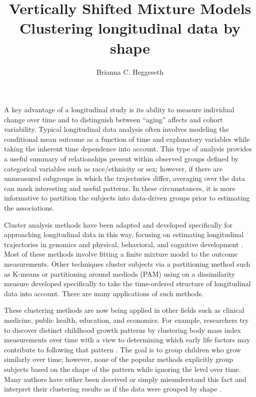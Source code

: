 \documentclass[12pt]{article}
\title{Vertically Shifted Mixture Models \\ Clustering longitudinal data by shape}
\author{Brianna C. Heggeseth}
\begin{document}
\maketitle

A key advantage of a longitudinal study is its ability to measure individual change over time and to distinguish between ``aging'' affects and cohort variability. Typical longitudinal data analysis often involves modeling the conditional mean outcome as a function of time and explanatory variables while taking the inherent time dependence into account. This type of analysis provides a useful summary of relationships present within observed groups defined by categorical variables such as race/ethnicity or sex; however, if there are unmeasured subgroups in which the trajectories differ, averaging over the data can mask interesting and useful patterns. In these circumstances, it is more informative to partition the subjects into data-driven groups prior to estimating the associations.

Cluster analysis methods have been adapted and developed specifically for approaching longitudinal data in this way, focusing on estimating longitudinal trajectories in genomics and physical, behavioral, and cognitive development \cite{schneiderman1993,genolini2010, jones2001, muthen2010, mcnicholas2010}. Most of these methods involve fitting a finite mixture model to the outcome measurements. Other techniques cluster subjects via a partitioning method such as K-means \cite{macqueen1967,hartigan1979} or partitioning around mediods (PAM) \cite{kaufman1990} using on a dissimilarity measure developed specifically to take the time-ordered structure of longitudinal data into account. There are many applications of such methods. 

These clustering methods are now being applied in other fields such as clinical medicine, public health, education, and economics. For example, researchers try to discover distinct childhood growth patterns by clustering body mass index measurements over time with a view to determining which early life factors may contribute to following that pattern \cite{pryor2011,carter2012}. The goal is to group children who grow similarly over time; however, none of the popular methods explicitly group subjects based on the shape of the pattern while ignoring the level over time. Many authors have either been deceived or simply misunderstand this fact and interpret their clustering results as if the data were grouped by shape \cite{pryor2011,carter2012,nagin1999}. 
\end{document}
